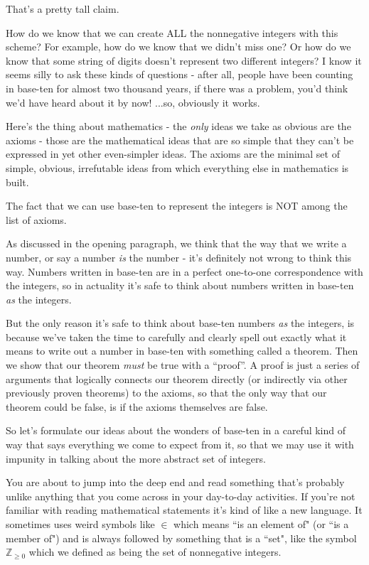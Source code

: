 \documentclass{article}
\begin{document}
That's a pretty tall claim.

How do we know that we can create ALL the nonnegative
integers with this scheme? For example,
how do we know that we didn't miss one? Or how do we know that some string of
digits doesn't represent two different integers? I know it seems silly to ask these kinds of questions - 
after all, people have been counting in base-ten for almost two thousand years,
if there was a problem, you'd think we'd have heard about it by now! ...so, obviously it works.

Here's the thing about mathematics - the \emph{only} ideas we take as obvious
are the axioms - those are the mathematical ideas that are so simple that they can't be expressed in
yet other even-simpler ideas. The axioms are the minimal set of simple, obvious, irrefutable ideas from which
everything else in mathematics is built.

The fact that
we can use base-ten to represent the integers is NOT among the list of axioms.

As discussed in the opening paragraph, we think that the way
that we write a number, or say a number \emph{is} the number - it's definitely not wrong to think this way.
Numbers written in base-ten are in
a perfect one-to-one correspondence with the integers, so in actuality it's safe to think about numbers written 
in base-ten \emph{as} the integers.

But the only reason it's safe to think about base-ten numbers \emph{as} the
integers, is because we've taken the time
to carefully and clearly spell out exactly what it means to write out a number in base-ten
with something called a theorem.
Then we show that our theorem \emph{must} be true with a ``proof''. A proof
is just a series of arguments that logically connects our theorem directly (or indirectly
via other previously proven theorems) to the axioms, so that the only way
that our theorem could be false, is if the axioms themselves are false.

So let's formulate our ideas about the wonders of base-ten
in a careful kind of way that says everything we come to expect from it,
so that we may use it with impunity in talking about the more abstract set of integers.

You are about to jump into the deep end and read something that's probably unlike anything that you come across in your day-to-day activities.
If you're not familiar with reading mathematical statements it's kind of like a new language. It sometimes uses
weird symbols like $\in$ which means ``is an element of" (or ``is a member of")
and is always followed by something that is a ``set", like the symbol $\mathbb{Z}_{\ge 0}$ which
we defined as being the set of nonnegative integers.
\end{document}

